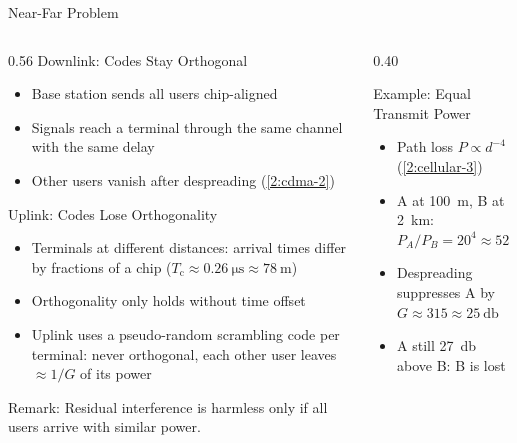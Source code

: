 \begin{frame}{Near-Far Problem}
  \begin{columns}[T,onlytextwidth]
    \begin{column}{0.56\textwidth}
      Downlink: Codes Stay Orthogonal
      \begin{itemize}
        \item Base station sends all users chip-aligned
        \item Signals reach a terminal through the same channel with the same delay
        \item Other users vanish after despreading (\cref{2:cdma-2})
      \end{itemize}
      \vspace{0.4em}
      Uplink: Codes Lose Orthogonality
      \begin{itemize}
        \item Terminals at different distances: arrival times differ by fractions of a chip ($T_\mathrm{c} \approx \qty{0.26}{\micro\second} \approx \qty{78}{\meter}$)
        \item Orthogonality only holds without time offset
        \item Uplink uses a pseudo-random scrambling code per terminal: never orthogonal, each other user leaves $\approx 1/G$ of its power
      \end{itemize}
      \alert{Remark:} Residual interference is harmless only if all users arrive with similar power.
    \end{column}
    \begin{column}{0.40\textwidth}
      \centering
      
      \begin{block}{Example: Equal Transmit Power}
        \begin{itemize}
          \item Path loss $P \propto d^{-4}$ (\cref{2:cellular-3})
          \item A at \qty{100}{\meter}, B at \qty{2}{\kilo\meter}: $P_A/P_B = 20^4 \approx \qty{52}{\decibel}$
          \item Despreading suppresses A by $G \approx 315 \approx \qty{25}{\decibel}$
          \item A still \qty{27}{\decibel} above B: B is lost
        \end{itemize}
      \end{block}
    \end{column}
  \end{columns}
\end{frame}

